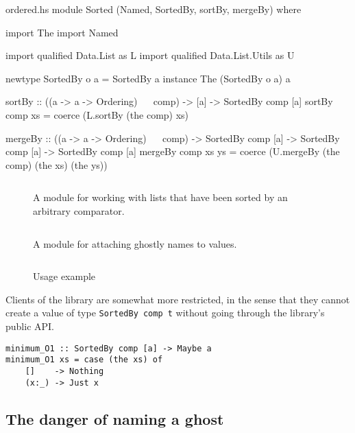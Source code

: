 \documentclass[format=sigplan, review=false, screen=true]{acmart}
\begin{document}
\begin{filecontents*}{ordered.hs}
module Sorted
  (Named, SortedBy, sortBy, mergeBy) where   

import The
import Named

import qualified Data.List as L
import qualified Data.List.Utils as U

newtype SortedBy o a = SortedBy a
instance The (SortedBy o a) a
  
sortBy :: ((a -> a -> Ordering) ~~ comp)
       -> [a]
       -> SortedBy comp [a]
sortBy comp xs = coerce (L.sortBy (the comp) xs)

mergeBy :: ((a -> a -> Ordering) ~~ comp)
        -> SortedBy comp [a]
        -> SortedBy comp [a]
        -> SortedBy comp [a]
mergeBy comp xs ys =
  coerce (U.mergeBy (the comp) (the xs) (the ys))        
\end{filecontents*}


\begin{figure}
  \inputminted{haskell}{ordered.hs}
  \caption{A module for working with lists that have been sorted by an arbitrary
    comparator.}
\end{figure}


\begin{figure}
  \inputminted{haskell}{named.hs}
  \caption{A module for attaching ghostly names to values.\label{name-module}}
\end{figure}

\begin{figure}
  \inputminted{haskell}{usageO.hs}
  \caption{Usage example}
  \end{figure}
Clients of the library are somewhat more restricted, in the sense that they cannot create a
value of type \texttt{SortedBy comp t} without going through the library's public API.

\begin{verbatim}
minimum_O1 :: SortedBy comp [a] -> Maybe a
minimum_O1 xs = case (the xs) of
    []    -> Nothing
    (x:_) -> Just x
\end{verbatim}

\subsection{The danger of naming a ghost}
\end{document}
